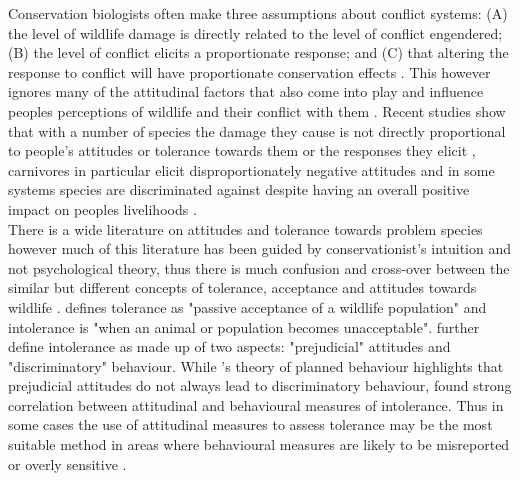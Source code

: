 Conservation biologists often make three assumptions about conflict systems: (A) the level of wildlife damage is directly related to the level of conflict engendered; (B) the level of conflict elicits a proportionate response; and (C) that altering the response to conflict will have proportionate conservation effects  \citep{Dickman2010b}. This however ignores many of the attitudinal factors that also come into play and influence peoples perceptions of wildlife and their conflict with them \citep{Dickman2010b}. Recent studies show that with a number of species the damage they cause is not directly proportional to people's attitudes or tolerance towards them or the responses they elicit \citep{Dickman2010b,Kansky2014d,Kansky2014e,Kansky2016}, carnivores in particular elicit disproportionately negative attitudes \citep{Kansky2014e} and in some systems species are discriminated against despite having an overall positive impact on peoples livelihoods \citep{Dickman2010b,Prowse2014}.\\

There is a wide literature on attitudes and tolerance towards problem species \citep{Kansky2014d,Kansky2014e} however much of this literature has been guided by conservationist's intuition and not psychological theory, thus there is much confusion and cross-over between the similar but different concepts of tolerance, acceptance and attitudes towards wildlife \citep{Bruskotter2015}. \citet{Bruskotter2012} defines tolerance as "passive acceptance of a wildlife population" and intolerance is "when an animal or population becomes unacceptable". \citet{Bruskotter2015,Treves2012b} further define intolerance as made up of two aspects: "prejudicial" attitudes and "discriminatory" behaviour. While \citet{Ajzen1991}'s theory of planned behaviour highlights that prejudicial attitudes do not always lead to discriminatory behaviour, \citet{Bruskotter2015} found strong correlation between attitudinal and behavioural measures of intolerance. Thus in some cases the use of attitudinal measures to assess tolerance may be the most suitable method in areas where behavioural measures are likely to be misreported or overly sensitive \citep{Bruskotter2015}.\\

